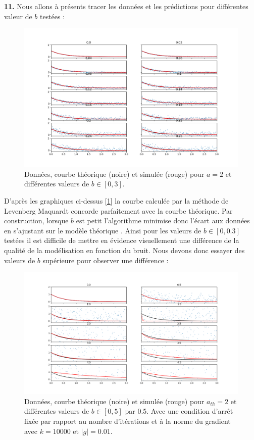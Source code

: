 \documentclass[12pt]{article}
\begin{document}
\textbf{\color{brick}11.} Nous allons à présents tracer les données et les prédictions pour différentes valeur de $b$ testées :

\begin{figure}[H]
\centering
\includegraphics[width=1\textwidth]{Q111.png}
\caption{Données, courbe théorique (noire) et simulée (rouge) pour $a=2$ et différentes valeurs de $b  \in [0,3]$.}
\label{FigQ111}
\end{figure}

 D'après les graphiques ci-dessus [\ref{FigQ111}] la courbe calculée par la méthode de Levenberg Maquardt concorde parfaitement avec la courbe théorique. Par construction, lorsque $b$  est petit l'algorithme minimise donc l'écart aux données en s'ajustant sur le modèle théorique . Ainsi pour les valeurs de $b \in [0, 0.3]$ testées il est difficile de mettre en évidence visuellement une différence de la qualité de la modélisation en fonction du bruit. Nous devons donc essayer  des valeurs de $b$ supérieure pour observer une différence : 
 
 \begin{figure}[H]
\centering
\includegraphics[width=1\textwidth]{Q1132.png}
\caption{Données, courbe théorique (noire) et simulée (rouge) pour $a_{th}=2$ et différentes valeurs de $b \in [0,5]$ par 0.5. Avec une condition d'arrêt fixée par rapport au nombre d'itérations et à la norme du gradient avec $k = 10000$ et $|g|=0.01$.}
\label{FigQ1132}


\end{figure}
\end{document}
